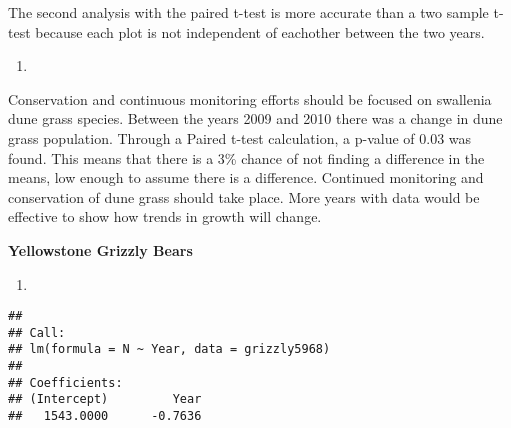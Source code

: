 \documentclass[]{article}
\newenvironment{Shaded}{\begin{snugshade}}{\end{snugshade}}
\newcommand{\KeywordTok}[1]{\textcolor[rgb]{0.13,0.29,0.53}{\textbf{#1}}}
\newcommand{\DataTypeTok}[1]{\textcolor[rgb]{0.13,0.29,0.53}{#1}}
\newcommand{\StringTok}[1]{\textcolor[rgb]{0.31,0.60,0.02}{#1}}
\newcommand{\CommentTok}[1]{\textcolor[rgb]{0.56,0.35,0.01}{\textit{#1}}}
\newcommand{\OperatorTok}[1]{\textcolor[rgb]{0.81,0.36,0.00}{\textbf{#1}}}
\newcommand{\NormalTok}[1]{#1}
\begin{document}
The second analysis with the paired t-test is more accurate than a two
sample t-test because each plot is not independent of eachother between
the two years.

\begin{enumerate}
\def\labelenumi{\arabic{enumi}.}
\setcounter{enumi}{4}
\item
\end{enumerate}

Conservation and continuous monitoring efforts should be focused on
swallenia dune grass species. Between the years 2009 and 2010 there was
a change in dune grass population. Through a Paired t-test calculation,
a p-value of 0.03 was found. This means that there is a 3\% chance of
not finding a difference in the means, low enough to assume there is a
difference. Continued monitoring and conservation of dune grass should
take place. More years with data would be effective to show how trends
in growth will change.

\textbf{Yellowstone Grizzly Bears}

\begin{enumerate}
\def\labelenumi{\arabic{enumi}.}
\setcounter{enumi}{5}
\item
\end{enumerate}

\begin{Shaded}
\end{Shaded}

\begin{verbatim}
## 
## Call:
## lm(formula = N ~ Year, data = grizzly5968)
## 
## Coefficients:
## (Intercept)         Year  
##   1543.0000      -0.7636
\end{verbatim}
\end{document}
